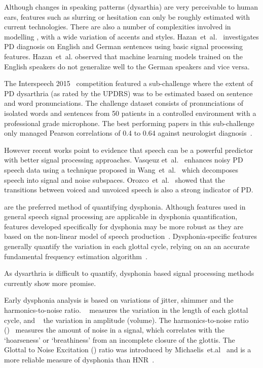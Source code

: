 \documentclass[12pt, twoside]{book}
\renewcommand\emph[1]{\textit{\color{USred}{#1}}}
\begin{document}
Although changes in speaking patterns (dysarthia) are very perceivable to human ears, features such as slurring or hesitation can only be roughly estimated with current technologies. There are also a number of complexities involved in modelling \emph{spoken language}, with a wide variation of accents and styles. Hazan~et~al.~\cite{hazan2012} investigates PD diagnosis on English and German sentences using basic signal processing features. Hazan~et~al. observed that machine learning models trained on the English speakers do not generalize well to the German speakers and vice versa. 

The Interspeech 2015~\cite{compareis15pd} competition featured a sub-challenge where the extent of PD dysarthria (as rated by the UPDRS) was to be estimated based on sentence and word pronunciations. The challenge dataset consists of pronunciations of isolated words and sentences from 50 patients in a controlled environment with a professional grade microphone. The best performing papers in this sub-challenge only managed Pearson correlations of 0.4 to 0.64 against neurologist diagnosis~\cite{hahm2015parkinson,grosz2015assessingis15,williamson2015segment}.

However recent works point to evidence that speech can be a powerful predictor with better signal processing approaches. Vasqeuz et~al.~\cite{vasquez2015automatic} enhances noisy PD speech data using a technique proposed in Wang~et~al.~\cite{wang2007speechenhancement} which decomposes speech into signal and noise subspaces. Orozco~et~al.~\cite{orozco2015voiced} showed that the transitions between voiced and unvoiced speech is also a strong indicator of PD.

\emph{Sustained vowel phonations} are the preferred method of quantifying dysphonia. Although features used in general speech signal processing are applicable in dysphonia quantification, features developed specifically for dysphonia may be more robust as they are based on the non-linear model of speech production~\cite{splittledysphonia2009, splittlenonlinear2007}. Dysphonia-specific features generally quantify the variation in each glottal cycle, relying on an an accurate fundamental frequency estimation algorithm~\cite{f0estimation}. 

\begin{highlight}
As dysarthria is difficult to quantify, dysphonia based signal processing methods currently show more promise.
\end{highlight}

Early dysphonia analysis is based on variations of jitter, shimmer and the harmonics-to-noise ratio. \emph{Jitter}~ measures the variation in the length of each glottal cycle, and \emph{shimmer}~\cite{shimmerjitter,jittertime} the variation in amplitude (volume). The harmonics-to-noise ratio (\emph{HNR})~\cite{HNRintro} measures the amount of noise in a signal, which correlates with the `hoarseness' or `breathiness' from an incomplete closure of the glottis.  The Glottal to Noise Excitation (\emph{GNE}) ratio was introduced by Michaelis~et.al~\cite{gne} and is a more reliable measure of dysphonia than HNR~\cite{gneratio}. 
\end{document}
